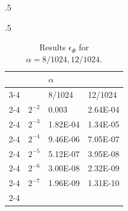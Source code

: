 \begin{table}[!htb]
\begin{subtable}{.5\linewidth}
    \caption{$N=128^3$}
    \end{subtable}%
    \begin{subtable}{.5\linewidth}
      \centering
      \begin{tabular}{llll}
                                &                               & $\alpha$                                              &                                                       \\ \cline{3-4} 
                                & \multicolumn{1}{l|}{}         & \multicolumn{1}{l|}{8/1024}                           & \multicolumn{1}{l|}{12/1024}                          \\ \cline{2-4} 
\multicolumn{1}{l|}{}           & \multicolumn{1}{l|}{$2^{-2}$} & \multicolumn{1}{l|}{\cellcolor[HTML]{C0C0C0}0.003}    & \multicolumn{1}{l|}{\cellcolor[HTML]{C0C0C0}2.64E-04} \\ \cline{2-4} 
\multicolumn{1}{l|}{}           & \multicolumn{1}{l|}{$2^{-3}$} & \multicolumn{1}{l|}{1.82E-04}                         & \multicolumn{1}{l|}{1.34E-05}                         \\ \cline{2-4} 
\multicolumn{1}{l|}{}           & \multicolumn{1}{l|}{$2^{-4}$} & \multicolumn{1}{l|}{\cellcolor[HTML]{C0C0C0}9.46E-06} & \multicolumn{1}{l|}{\cellcolor[HTML]{C0C0C0}7.05E-07} \\ \cline{2-4} 
\multicolumn{1}{l|}{$\Delta t$} & \multicolumn{1}{l|}{$2^{-5}$} & \multicolumn{1}{l|}{5.12E-07}                         & \multicolumn{1}{l|}{3.95E-08}                         \\ \cline{2-4} 
\multicolumn{1}{l|}{}           & \multicolumn{1}{l|}{$2^{-6}$} & \multicolumn{1}{l|}{\cellcolor[HTML]{C0C0C0}3.00E-08} & \multicolumn{1}{l|}{\cellcolor[HTML]{C0C0C0}2.32E-09} \\ \cline{2-4} 
\multicolumn{1}{l|}{}           & \multicolumn{1}{l|}{$2^{-7}$} & \multicolumn{1}{l|}{1.96E-09}                         & \multicolumn{1}{l|}{1.31E-10}                         \\ \cline{2-4} 
\end{tabular}
	
    \caption{$N=256^3,512^3,1024^3$}
    \end{subtable} 
    
    \caption{Results $\epsilon_{\Phi}$ for $\alpha=8/1024,12/1024$.}
    \label{tbl:accuracy:2}
\end{table}

